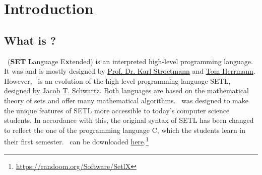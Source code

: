 
\chapter{Introduction}

\section*{What is \setlx?}

	\setlx\ (\textbf{SET} \textbf{L}anguage E\textbf{x}tended) is an interpreted high-level programming language. It was and is mostly designed by \href{https://github.com/karlstroetmann}{Prof. Dr. Karl Stroetmann} and \href{https://github.com/herrmanntom}{Tom Herrmann}. However, \setlx\ is an evolution of the high-level programming language SETL, designed by \href{https://en.wikipedia.org/wiki/Jacob_T._Schwartz}{Jacob T. Schwartz}. Both languages are based on the mathematical theory of sets and offer many mathematical algorithms. \setlx\ was designed to make the unique features of SETL more accessible to today's computer science students. In accordance with this, the original syntax of SETL has been changed to reflect the one of the programming language C, which the students learn in their first semester. \setlx\ can be downloaded \href{https://randoom.org/Software/SetlX}{here}.\footnote{\url{https://randoom.org/Software/SetlX}}